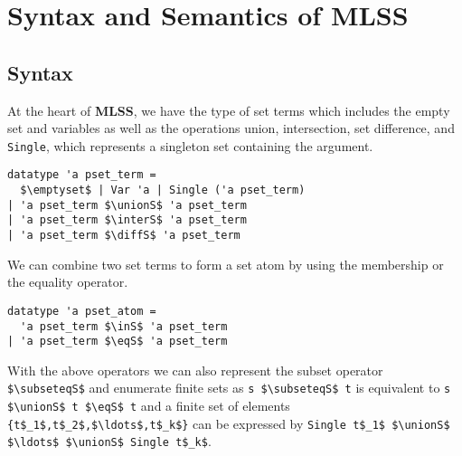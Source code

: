 \documentclass[sigplan,10pt,anonymous,review]{acmart}
\newcommand{\MLSS}{\textbf{MLSS}}
\newcommand{\unionS}{\sqcup_\text{s}}
\newcommand{\interS}{\sqcap_\text{s}}
\newcommand{\diffS}{-_\text{s}}
\newcommand{\inS}{\in_\text{s}}
\newcommand{\eqS}{\approx_\text{s}}
\newcommand{\subseteqS}{\sqsubseteq_\text{s}}
\begin{document}
\section{Syntax and Semantics of MLSS\label{sec:semantics}}
\subsection{Syntax}
At the heart of \MLSS{}, we have the type of set terms which includes the empty set and variables as well as the operations union, intersection, set difference, and \lstinline!Single!, which represents a singleton set containing the argument.
\begin{lstlisting}
datatype 'a pset_term =
  $\emptyset$ | Var 'a | Single ('a pset_term)
| 'a pset_term $\unionS$ 'a pset_term
| 'a pset_term $\interS$ 'a pset_term
| 'a pset_term $\diffS$ 'a pset_term
\end{lstlisting}
We can combine two set terms to form a set atom by using the membership or the equality operator.
\begin{lstlisting}
datatype 'a pset_atom =
  'a pset_term $\inS$ 'a pset_term
| 'a pset_term $\eqS$ 'a pset_term
\end{lstlisting}
With the above operators we can also represent the subset operator \lstinline!$\subseteqS$! and enumerate finite sets as \lstinline!s $\subseteqS$ t! is equivalent to \lstinline!s $\unionS$ t $\eqS$ t! and a finite set of elements \lstinline!{t$_1$,t$_2$,$\ldots$,t$_k$}! can be expressed by \lstinline!Single t$_1$ $\unionS$ $\ldots$ $\unionS$ Single t$_k$!.
\end{document}
